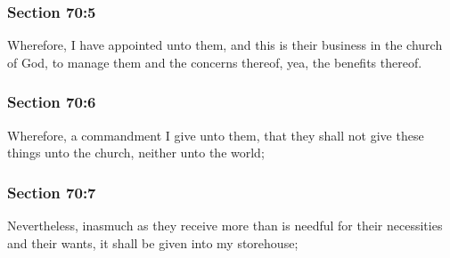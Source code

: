 	\subsubsection{Section 70:5} %
		\label{DC70-5}

		Wherefore, I have appointed unto them, and this is their business in the church of God, to manage them and the concerns thereof, yea, the benefits thereof.


	\subsubsection{Section 70:6} %
		\label{DC70-6}

		Wherefore, a commandment I give unto them, that they shall not give these things unto the church, neither unto the world;


	\subsubsection{Section 70:7} %
		\label{DC70-7}

		Nevertheless, inasmuch as they receive more than is needful for their necessities and their wants, it shall be given into my storehouse;


